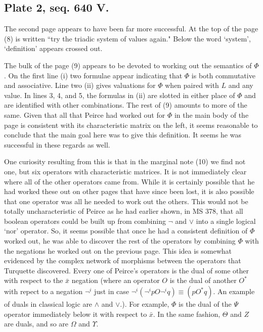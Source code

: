 \documentclass[12pt]{article}
\begin{document}
\subsection{Plate 2, seq. 640 V.}

The second page appears to have been far more successful. At the top of the page (8) is written ``try the triadic system of values again." Below the word `system', `definition' appears crossed out.

The bulk of the page (9) appears to be devoted to working out the semantics of $\Phi$. On the first line (i) two formulae appear indicating that $\Phi$ is both commutative and associative. Line two (ii) gives valuations for $\Phi$ when paired with $L$ and any value. In lines 3, 4, and 5, the formulas in (ii) are slotted in either place of $\Phi$ and are identified with other combinations. The rest of (9) amounts to more of the same. Given that all that Peirce had worked out for $\Phi$ in the main body of the page is consistent with its characteristic matrix on the left, it seems reasonable to conclude that the main goal here was to give this definition. It seems he was successful in these regards as well.

One curiosity resulting from this is that in the marginal note (10) we find not one, but six operators with characteristic matrices. It is not immediately clear where all of the other operators came from. While it is certainly possible that he had worked these out on other pages that have since been lost, it is also possible that one operator was all he needed to work out the others. This would not be totally uncharacteristic of Peirce as he had earlier shown, in MS 378, that all boolean operators could be built up from combining $\lnot$ and $\lor$ into a single logical `nor' operator. So, it seems possible that once he had a consistent definition of $\Phi$ worked out, he was able to discover the rest of the operators by combining $\Phi$ with the negations he worked out on the previous page. This idea is somewhat evidenced by the complex network of morphisms between the operators that Turquette discovered. Every one of Peirce's operators is the dual of some other with respect to the $\bar{x}$ negation (where an operator $O$ is the dual of another $O^{*}$ with repect to a negation $\lnot^{i}$ just in case $\lnot^{i}(\lnot^{i}p O \lnot^{i}q)\equiv (p O^{*} q)$. An example of duals in classical logic are $\land$ and $\lor$.). For example, $\Phi$ is the dual of the $\Psi$ operator immediately below it with respect to $\bar{x}$. In the same fashion, $\Theta$ and $Z$ are duals, and so are $\Omega$ and $\Upsilon$. 
\end{document}
